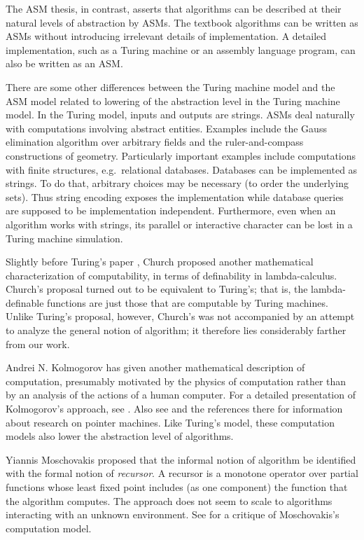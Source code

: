 \documentclass{LMCS}
\theoremstyle{definition}
\begin{document}
The ASM thesis, in contrast, asserts that algorithms can be described at
their natural levels of abstraction by ASMs.  The textbook algorithms can
be written as ASMs without introducing irrelevant details of
implementation.  A detailed implementation, such as a Turing machine or an
assembly language program, can also be written as an ASM.

There are some other differences between the Turing machine model and the
ASM model related to lowering of the abstraction level in the Turing
machine model.  In the Turing model, inputs and outputs are strings.  ASMs
deal naturally with computations involving abstract entities.  Examples
include the Gauss elimination algorithm over arbitrary fields and the
ruler-and-compass constructions of geometry.  Particularly important
examples include computations with finite structures, e.g.\ relational
databases.  Databases can be implemented as strings.  To do that, arbitrary
choices may be necessary (to order the underlying sets).  Thus string
encoding exposes the implementation while database queries are supposed to
be implementation independent.  Furthermore, even when an algorithm works
with strings, its parallel or interactive character can be lost in a
Turing machine simulation.

Slightly before Turing's paper \cite{turing}, Church \cite{church}
proposed another mathematical characterization of computability, in
terms of definability in lambda-calculus.  Church's proposal
turned out to be equivalent to Turing's; that is, the lambda-definable
functions are just those that are computable by Turing machines.
Unlike Turing's proposal, however, Church's was not accompanied by an
attempt to analyze the general notion of algorithm; it therefore lies
considerably farther from our work.

Andrei N. Kolmogorov \cite{K53} has given another mathematical description
of computation, presumably motivated by the physics of computation rather
than by an analysis of the actions of a human computer.  For a detailed
presentation of Kolmogorov's approach, see \cite{KU58}.  Also see
\cite{abs} and the references there for information about research on
pointer machines.  Like Turing's model, these computation models
also lower the abstraction level of algorithms.

Yiannis Moschovakis \cite{mosch} proposed that the informal notion of
algorithm be identified with the formal notion of \emph{recursor}.  A
recursor is a monotone operator over partial functions whose least fixed
point includes (as one component) the function that the algorithm
computes.  The approach does not seem to scale to algorithms interacting
with an unknown environment.  See \cite[Section~4.3]{abs} for a critique
of Moschovakis's computation model.
\end{document}
